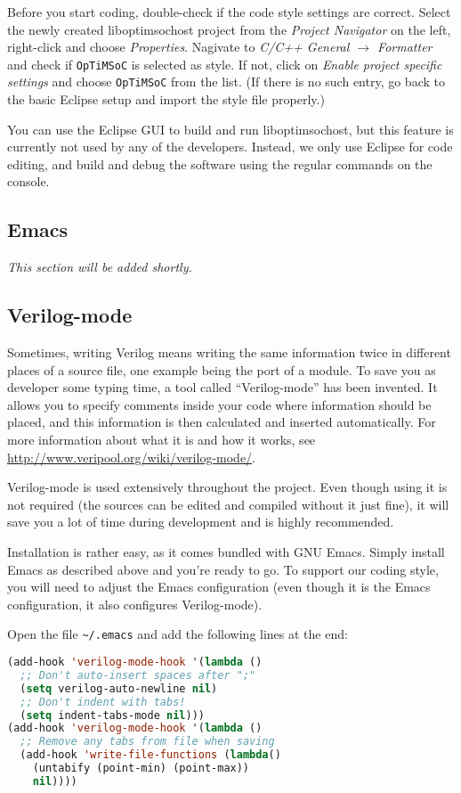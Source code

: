 Before you start coding, double-check if the code style settings are correct.
Select the newly created liboptimsochost project from the \emph{Project
Navigator} on the left, right-click and choose \emph{Properties}. Nagivate to
\emph{C/C++ General $\rightarrow$ Formatter} and check if \verb|OpTiMSoC| is
selected as style. If not, click on \emph{Enable project specific settings} and
choose \verb|OpTiMSoC| from the list. (If there is no such entry, go back to the
basic Eclipse setup and import the style file properly.)

You can use the Eclipse GUI to build and run liboptimsochost, but this feature
is currently not used by any of the developers. Instead, we only use Eclipse
for code editing, and build and debug the software using the regular commands
on the console.


\subsection{Emacs}
\emph{This section will be added shortly.}

\subsection{Verilog-mode}

Sometimes, writing Verilog means writing the same information twice in
different places of a source file, one example being the port of a module. To
save you as developer some typing time, a tool called ``Verilog-mode'' has been
invented. It allows you to specify comments inside your code where information
should be placed, and this information is then calculated and inserted
automatically. For more information about what it is and how it works, see
\url{http://www.veripool.org/wiki/verilog-mode/}.

Verilog-mode is used extensively throughout the project. Even though using it
is not required (the sources can be edited and compiled without it just fine),
it will save you a lot of time during development and is highly recommended.

Installation is rather easy, as it comes bundled with GNU Emacs. Simply install
Emacs as described above and you're ready to go. To support our coding style,
you will need to adjust the Emacs configuration (even though it is the Emacs
configuration, it also configures Verilog-mode).

Open the file \verb|~/.emacs| and add the following lines at the end:
\begin{lstlisting}[language=Lisp]
(add-hook 'verilog-mode-hook '(lambda ()
  ;; Don't auto-insert spaces after ";"
  (setq verilog-auto-newline nil)
  ;; Don't indent with tabs!
  (setq indent-tabs-mode nil)))
(add-hook 'verilog-mode-hook '(lambda ()
  ;; Remove any tabs from file when saving
  (add-hook 'write-file-functions (lambda()
    (untabify (point-min) (point-max))
    nil))))
\end{lstlisting}


